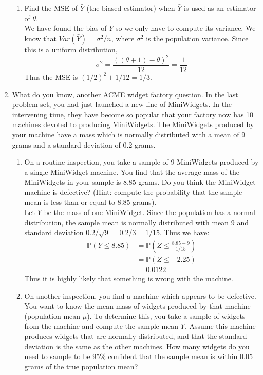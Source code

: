 \documentclass[12pt]{article}
\def\P{{\mathbb P}}
\begin{document}
\begin{enumerate}
\begin{enumerate}
\item Find the MSE of $\bar{Y}$ (the biased estimator) when $\bar{Y}$ is used as an estimator of $\theta$.\\

We have found the bias of $\bar{Y}$ so we only have to compute its variance. We know that $Var(\bar{Y}) = \sigma^2 / n$, where $\sigma^2$ is the population variance. Since this is a uniform distribution,
\[
\sigma^2 = \frac{((\theta + 1) - \theta)^2}{12} = \frac{1}{12}
\]
Thus the MSE is $(1/2)^2 + 1/12 = 1/3$.
\end{enumerate}

\item What do you know, another ACME widget factory question. In the last problem set, you had just launched a new line of MiniWidgets. In the intervening time, they have become so popular that your factory now has 10 machines devoted to producing MiniWidgets. The MiniWidgets produced by your machine have a mass which is normally distributed with a mean of 9 grams and a standard deviation of 0.2 grams.
\begin{enumerate}
\item On a routine inspection, you take a sample of 9 MiniWidgets produced by a single MiniWidget machine. You find that the average mass of the MiniWidgets in your sample is 8.85 grams. Do you think the MiniWidget machine is defective? (Hint: compute the probability that the sample mean is less than or equal to 8.85 grams).\\

Let $Y$ be the mass of one MiniWidget. Since the population has a normal distribution, the sample mean is normally distributed with mean 9 and standard deviation $0.2 / \sqrt{9} = 0.2 / 3  = 1/15$. Thus we have:
\begin{align*}
\P(Y \leq 8.85) &= \P \left( Z \leq \frac{8.85 - 9}{1/15} \right) \\
&= \P(Z \leq -2.25) \\
&= 0.0122
\end{align*}
Thus it is highly likely that something is wrong with the machine.

\item On another inspection, you find a machine which appears to be defective. You want to know the mean mass of widgets produced by that machine (population mean $\mu$). To determine this, you take a sample of widgets from the machine and compute the sample mean $\bar{Y}$. Assume this machine produces widgets that are normally distributed, and that the standard deviation is the same as the other machines. How many widgets do you need to sample to be 95\% confident that the sample mean is within 0.05 grams of the true population mean?\\


\end{enumerate}
\end{enumerate}
\end{document}
